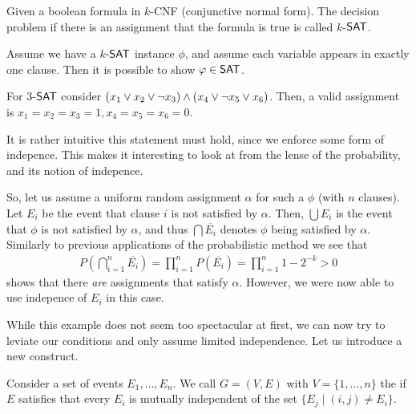 
\begin{definition}
    Given a boolean formula in $k$-CNF (conjunctive normal form).
    The decision problem if there is an assignment that the formula is true is called $k$-$\mathsf{SAT}$.
\end{definition}
Assume we have a $k$-$\mathsf{SAT}$ instance $\phi$, and assume each variable appears in exactly one clause.
Then it is possible to show $\phi \in \SAT$.
\begin{example}
    For $3$-$\mathsf{SAT}$ consider $(x_1 \vee x_2 \vee \neg x_3) \wedge (x_4 \vee \neg x_5 \vee x_6)$.
    Then, a valid assignment is $x_1 = x_2 = x_3 = 1, x_4=x_5=x_6=0$.
\end{example}
It is rather intuitive this statement must hold, since we enforce some form of indepence.
This makes it interesting to look at from the lense of the probability, and its notion of indepence.

So, let us assume a uniform random assignment $\alpha$ for such a $\phi$ (with $n$ clauses).
Let $E_i$ be the event that clause $i$ is not satisfied by $\alpha$.
Then, $\bigcup E_i$ is the event that $\phi$ is not satisfied by $\alpha$, and thus
$\bigcap \overline{E_i}$ denotes $\phi$ being satisfied by $\alpha$.
Similarly to previous applications of the probabilistic method we see that
\begin{align}
    P\left(\bigcap_{i=1}^n \overline{E_i}\right) = \prod_{i=1}^n P(\overline{E_i}) = \prod_{i=1}^{n}1 - 2^{-k} > 0
\end{align}
shows that there \emph{are} assignments that satisfy $\alpha$.
However, we were now able to use indepence of $E_i$ in this case.

While this example does not seem too spectacular at first, we can now try to leviate our conditions
and only assume limited independence.
Let us introduce a new construct.
\begin{definition}
    Consider a set of events $E_1, \dots, E_n$.
    We call $G = (V,E)$ with $V= \{1, \dots, n\}$ the  if $E$ satisfies that
    every $E_i$ is mutually independent of the set $\{E_j \mid (i,j) \neq E_i \}$.
\end{definition}


